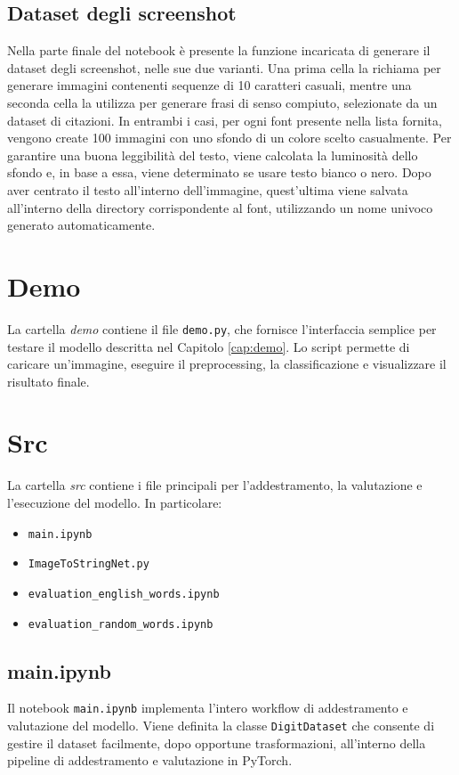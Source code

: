 \subsection{Dataset degli screenshot}
Nella parte finale del notebook è presente la funzione incaricata di generare il dataset degli screenshot, nelle sue due varianti. Una prima cella la richiama per generare immagini contenenti sequenze di 10 caratteri casuali, mentre una seconda cella la utilizza per generare frasi di senso compiuto, selezionate da un dataset di citazioni. In entrambi i casi, per ogni font presente nella lista fornita, vengono create 100 immagini con uno sfondo di un colore scelto casualmente. Per garantire una buona leggibilità del testo, viene calcolata la luminosità dello sfondo e, in base a essa, viene determinato se usare testo bianco o nero. Dopo aver centrato il testo all’interno dell’immagine, quest’ultima viene salvata all’interno della directory corrispondente al font, utilizzando un nome univoco generato automaticamente.
\section{Demo}
La cartella \emph{demo} contiene il file \texttt{demo.py}, che fornisce l'interfaccia semplice per testare il modello descritta nel Capitolo \ref{cap:demo}. Lo script permette di caricare un'immagine, eseguire il preprocessing, la classificazione e visualizzare il risultato finale.

\section{Src}
La cartella \emph{src} contiene i file principali per l'addestramento, la valutazione e l'esecuzione del modello. In particolare:
\begin{itemize}
    \item \texttt{main.ipynb}
    \item \texttt{ImageToStringNet.py}
    \item \texttt{evaluation\_english\_words.ipynb}
    \item \texttt{evaluation\_random\_words.ipynb}
\end{itemize}

\subsection{main.ipynb}
Il notebook \texttt{main.ipynb} implementa l'intero workflow di addestramento e valutazione del modello. Viene definita la classe \texttt{DigitDataset} che consente di gestire il dataset facilmente, dopo opportune trasformazioni, all'interno della pipeline di addestramento e valutazione in PyTorch.

